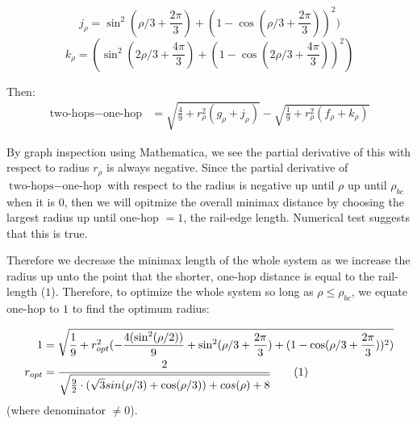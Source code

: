 \documentclass[11pt]{article}
\newcommand\numberthis{\addtocounter{equation}{1}\tag{\theequation}}
\begin{document}
\begin{equation}
  j_{\rho} = \sin^2(\rho/3+ \frac{2\pi}{3})  + (1 - \cos(\rho/3 + \frac{2\pi}{3}))^2)
\end{equation}
\begin{equation}
  k_{\rho} = (\sin^2(2\rho/3 + \frac{4\pi}{3})  + (1 - \cos(2\rho/3 + \frac{4\pi}{3}))^2)
\end{equation}

Then:
\begin{align*}
  \text{two-hops} - \text{one-hop}  &= \sqrt{\frac{4}{9}  + r_{\rho}^2(g_{\rho}+ j_{\rho})}
  - \sqrt{\frac{1}{9} +r_{\rho}^2(f_{\rho}+k_{\rho}) }
\end{align*}









By graph inspection using Mathematica, we see the partial derivative of this with respect to
radius $r_{\rho}$ is always negative.
Since the partial derivative of $\text{two-hops} - \text{one-hop}$ with respect to the
radius is negative up until $\rho$ up until $\rho_{bc}$ when it is $0$, then
we will opitmize the overall minimax distance by choosing the largest radius
up until one-hop $= 1$, the rail-edge length. Numerical test suggests that this is true.


Therefore we decrease the minimax length
of the whole system as we increase the radius
up unto the point that the shorter, one-hop distance is equal to the rail-length ($1$).
Therefore, to optimize the whole system so long as $\rho \leq \rho_{bc}$,
we equate one-hop to $1$ to find the optimum radius:


\begin{align*}
  1 &=  \sqrt{\frac{1}{9}  + r_{opt}^2(-\frac{4 (\sin^2( \rho / 2))}{9} + \sin^2(\rho/3+ \frac{2\pi}{3})  + (1 - \cos(\rho/3 + \frac{2\pi}{3}))^2)} \\
  r_{opt} &= \frac{2}{\sqrt{\frac{9}{2} \cdot ( \sqrt{3} sin(\rho/3) + \cos(\rho/3)) + cos(\rho)+ 8 }} \numberthis  \label{eqrhoopt} \\
\end{align*}
(where denominator $  \neq 0$).
\end{document}
